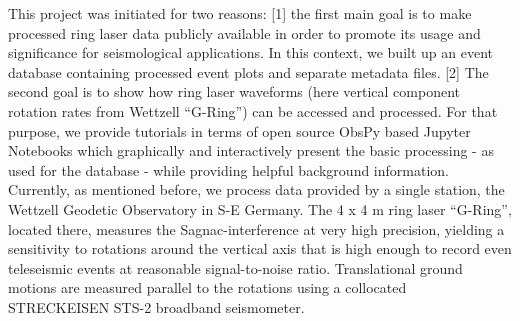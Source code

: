 \documentclass[12pt,reqno]{article} %
\begin{document}
This project was initiated for two reasons: 
[1] the first main goal is to make processed ring laser data publicly available in order to promote its usage and significance for seismological applications. In this context, we built up an event database containing processed event plots and separate metadata files.
[2] The second goal is to show how ring laser waveforms (here vertical component rotation rates from Wettzell “G-Ring”) can be accessed and processed. For that purpose, we provide tutorials in terms of open source ObsPy \citep{Megies2011,Krischer2015} based Jupyter Notebooks \citep{Perez2007} which graphically and interactively present the basic processing - as used for the database - while providing helpful background information.
\\
Currently, as mentioned before, we process data provided by a single station, the Wettzell Geodetic Observatory in S-E Germany. The 4 x 4 m ring laser “G-Ring”, located there, measures the Sagnac-interference at very high precision, yielding a sensitivity to rotations around the vertical axis that is high enough to record even teleseismic events at reasonable signal-to-noise ratio.
Translational ground motions are measured parallel to the rotations using a collocated STRECKEISEN STS-2 broadband seismometer.
\\
% 
% 
\end{document}

